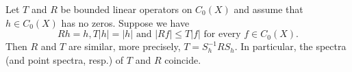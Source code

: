 \begin{lemma}\label{lem:b3-2.3}
Let $T$ and $R$ be bounded linear operators on $C_{0}(X)$ and assume that $h \in C_{0}(X)$ has no zeros. 
Suppose we have
\begin{equation}\label{eq:b3-2.8}
	Rh = h, T|h| = |h| \text{ and } |Rf| \leq T|f| \text{ for every $f \in C_{0}(X)$.} 
\end{equation}
Then $R$ and $T$ are similar, more precisely, $T = S_{h}^{-1}RS_{h}$.
In particular, the spectra (and point spectra, resp.) of $T$ and $R$ coincide.
\end{lemma}
